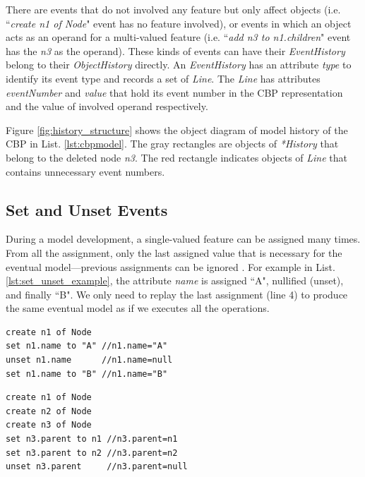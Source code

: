 \documentclass{llncs}
\begin{document}
There are events that do not involved any feature but only affect objects (i.e. ``\emph{create n1 of Node}" event has no feature involved), or events in which an object acts as an operand for a multi-valued feature (i.e. ``\emph{add n3 to n1.children}" event has the \emph{n3} as the operand). These kinds of events can have their \emph{EventHistory} belong to their \emph{ObjectHistory} directly. An \emph{EventHistory} has an attribute \emph{type} to identify its event type and records a set of \emph{Line}. The \emph{Line} has attributes \emph{eventNumber} and \emph{value} that hold its event number in the CBP representation and the value of involved operand respectively. 

Figure \ref{fig:history_structure} shows the object diagram of model history of the CBP in List. \ref{lst:cbpmodel}. The gray rectangles are objects of \emph{*History} that belong to the deleted node \emph{n3}. The red rectangle indicates objects of \emph{Line} that contains unnecessary event numbers.    

\subsection{Set and Unset Events}
\label{subsec:set_and_unset_events}
During a model development, a single-valued feature can be assigned many times. From all the assignment, only the last assigned value that is necessary for the eventual model---previous assignments can be ignored . For example in List. \ref{lst:set_unset_example}, the attribute \emph{name} is assigned ``A", nullified (unset), and finally ``B". We only need to replay the last assignment (line 4) to produce the same eventual model as if we executes all the operations. 

\noindent
\begin{minipage}[t]{0.49\linewidth}
\begin{lstlisting}[style=eol,caption={The CBP representation of attribute \emph{name} assignments.},label=lst:set_unset_example]
create n1 of Node
set n1.name to "A" //n1.name="A"    
unset n1.name      //n1.name=null
set n1.name to "B" //n1.name="B"
\end{lstlisting}
\end{minipage}
\hfill
\begin{minipage}[t]{0.49\linewidth}
\begin{lstlisting}[style=eol,caption={The CBP representation of reference  \emph{parent} assignments.},label=lst:set_unset_reference]
create n1 of Node
create n2 of Node
create n3 of Node
set n3.parent to n1 //n3.parent=n1
set n3.parent to n2 //n3.parent=n2
unset n3.parent     //n3.parent=null
\end{lstlisting}
\end{minipage}
\end{document}
